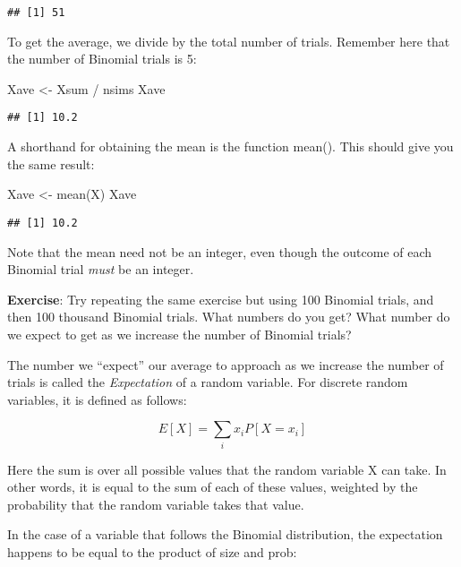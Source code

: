 \documentclass[
]{book}
\newenvironment{Shaded}{\begin{snugshade}}{\end{snugshade}}
\newcommand{\FunctionTok}[1]{\textcolor[rgb]{0.00,0.00,0.00}{#1}}
\newcommand{\NormalTok}[1]{#1}
\newcommand{\OtherTok}[1]{\textcolor[rgb]{0.56,0.35,0.01}{#1}}
\newcommand{\SpecialCharTok}[1]{\textcolor[rgb]{0.00,0.00,0.00}{#1}}
\begin{document}
\begin{verbatim}
## [1] 51
\end{verbatim}

To get the average, we divide by the total number of trials. Remember here that the number of Binomial trials is 5:

\begin{Shaded}
\begin{Highlighting}[]
\NormalTok{Xave }\OtherTok{\textless{}{-}}\NormalTok{ Xsum }\SpecialCharTok{/}\NormalTok{ nsims}
\NormalTok{Xave}
\end{Highlighting}
\end{Shaded}

\begin{verbatim}
## [1] 10.2
\end{verbatim}

A shorthand for obtaining the mean is the function mean(). This should give you the same result:

\begin{Shaded}
\begin{Highlighting}[]
\NormalTok{Xave }\OtherTok{\textless{}{-}} \FunctionTok{mean}\NormalTok{(X)}
\NormalTok{Xave}
\end{Highlighting}
\end{Shaded}

\begin{verbatim}
## [1] 10.2
\end{verbatim}

Note that the mean need not be an integer, even though the outcome of each Binomial trial \emph{must} be an integer.

\textbf{Exercise}: Try repeating the same exercise but using 100 Binomial trials, and then 100 thousand Binomial trials. What numbers do you get? What number do we expect to get as we increase the number of Binomial trials?

The number we ``expect'' our average to approach as we increase the number of trials is called the \emph{Expectation} of a random variable. For discrete random variables, it is defined as follows:

\[E[X] = \sum_{i}x_iP[X=x_i]\]

Here the sum is over all possible values that the random variable X can take. In other words, it is equal to the sum of each of these values, weighted by the probability that the random variable takes that value.

In the case of a variable that follows the Binomial distribution, the expectation happens to be equal to the product of size and prob:
\end{document}
